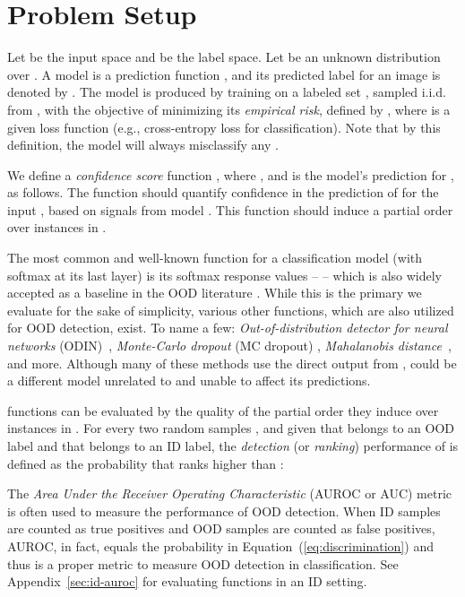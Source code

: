 \documentclass[table]{article} \usepackage{PRIMEarxiv}
\begin{document}
\section{Problem Setup}
\label{sec:problem_setup}
Let  be the input space and  be the label space.
Let  be an unknown distribution over .
A model  is a prediction function , and its predicted label for an image  is denoted by . 
The model  is produced by training on a labeled set , sampled i.i.d. from , with the objective of minimizing its \emph{empirical risk}, defined by , where  is a given loss function (e.g., cross-entropy loss for classification).
Note that by this definition, the model  will always misclassify any .

We define a \emph{confidence score} function , where , and  is the model's prediction for , as follows.
The function  should quantify confidence in the prediction of  for the input , based on signals from model . This function should induce a partial order over instances in .


The most common and well-known  function for a classification model  (with softmax at its last layer) is its softmax response values --  \citep{410358,827457} -- which is also widely accepted as a baseline in the OOD literature \citep{DBLP:conf/iclr/HendrycksG17, DBLP:conf/cvpr/HendrycksZBSS21, DBLP:conf/miccai/BergerPGK21, DBLP:conf/nips/ShalevAK18}.
While this is the primary  we evaluate for the sake of simplicity, various other  functions, which are also utilized for OOD detection, exist. To name a few: \emph{Out-of-distribution detector for neural networks} (ODIN)~\citep{liang2018enhancing}, \emph{Monte-Carlo dropout} (MC dropout) \citep{gal2016dropout}, \emph{Mahalanobis distance}~\citep{DBLP:conf/nips/LeeLLS18}, and more. Although many of these methods use the direct output from ,  could be a different model unrelated to  and unable to affect its predictions.

 functions can be evaluated by the quality of the partial order they induce over instances in .
For every two random samples , and given that  belongs to an OOD label and that  belongs to an ID label, the \emph{detection} (or \emph{ranking}) performance of  is defined as the probability that  ranks  higher than : 

The \emph{Area Under the Receiver Operating Characteristic} (AUROC or AUC) metric is often used to measure the performance of OOD detection. When ID samples are counted as true positives and OOD samples are counted as false positives, AUROC, in fact, equals the probability in Equation~(\ref{eq:discrimination}) \citep{FAWCETT2006861} and thus is a proper metric to measure OOD detection in classification. See Appendix~\ref{sec:id-auroc} for evaluating  functions in an ID setting.
\end{document}
